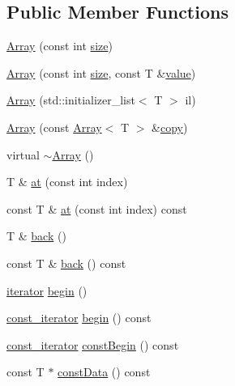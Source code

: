 \subsection*{Public Member Functions}
\begin{DoxyCompactItemize}
\item 
\hyperlink{classprism_1_1_array_aab128f1ed5a4547a04812b921dc75897}{Array} (const int \hyperlink{classprism_1_1_array_a83c88f0f351ac35798f40ed4e922e187}{size})
\item 
\hyperlink{classprism_1_1_array_ac696e19a99b7a601f013352617689098}{Array} (const int \hyperlink{classprism_1_1_array_a83c88f0f351ac35798f40ed4e922e187}{size}, const T \&\hyperlink{classprism_1_1_array_a2c5690996975510eed7112066b936d8f}{value})
\item 
\hyperlink{classprism_1_1_array_ada5fda23d2713ee3b2875495c77948b2}{Array} (std\+::initializer\+\_\+list$<$ T $>$ il)
\item 
\hyperlink{classprism_1_1_array_a15f0a0b32b4d95975fd15f0c1321d144}{Array} (const \hyperlink{classprism_1_1_array}{Array}$<$ T $>$ \&\hyperlink{namespaceprism_ae776f4cd825f79e7af1cf6ee1d90a209}{copy})
\item 
virtual \hyperlink{classprism_1_1_array_ad8787402f15054e257a7b407f07f469e}{$\sim$\+Array} ()
\item 
T \& \hyperlink{classprism_1_1_array_a669341733bb97105adcedc9a9e159dcd}{at} (const int index)
\item 
const T \& \hyperlink{classprism_1_1_array_ae88b7be661d69a754c1a9a49adb7e9b7}{at} (const int index) const 
\item 
T \& \hyperlink{classprism_1_1_array_a23345041d2c537ad6cffc7e2a3afcfe4}{back} ()
\item 
const T \& \hyperlink{classprism_1_1_array_a4efee82c9091e2656d65ea5a9a2c2fd8}{back} () const 
\item 
\hyperlink{classprism_1_1_array_acf99b1f921727cf61cf9d5b66acc66b8}{iterator} \hyperlink{classprism_1_1_array_a2458620d3d5270c7ce2cb6413b65e731}{begin} ()
\item 
\hyperlink{classprism_1_1_array_a1654729fe986281be9c0064999caf3d7}{const\+\_\+iterator} \hyperlink{classprism_1_1_array_a37f88fd8b0776145a47e7d14b7681d28}{begin} () const 
\item 
\hyperlink{classprism_1_1_array_a1654729fe986281be9c0064999caf3d7}{const\+\_\+iterator} \hyperlink{classprism_1_1_array_a08b8bf28cf5ee167e240792923c90415}{const\+Begin} () const 
\item 
const T $\ast$ \hyperlink{classprism_1_1_array_af6e860868e38d2779f0839e1815ea0bd}{const\+Data} () const 

\end{DoxyCompactItemize}
